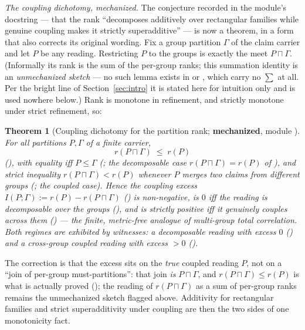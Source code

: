 \documentclass[11pt]{article}
\newtheorem{theorem}{Theorem}
\begin{document}
\emph{The coupling dichotomy, mechanized.}  The conjecture recorded
in the module's docstring --- that the rank ``decomposes additively
over rectangular families while genuine coupling makes it strictly
superadditive'' --- is now a theorem, in a form that also corrects
its original wording.  Fix a group partition $\Gamma$ of the claim
carrier and let $P$ be any reading.  Restricting $P$ to the groups
is exactly the meet $P \sqcap \Gamma$.  (Informally its rank is the
sum of the per-group ranks; this summation identity is an
\emph{unmechanized sketch} --- no such lemma exists in
 or , which carry no
$\sum$ at all.  Per the bright line of Section~\ref{sec:intro} it is
stated here for intuition only and is used nowhere below.)  Rank is
monotone in refinement, and strictly
monotone under strict refinement, so:
\begin{theorem}[Coupling dichotomy for the partition rank;
\textbf{mechanized}, module ]
\label{thm:couplingrank}
For all partitions $P, \Gamma$ of a finite carrier,
\[
  r(P \sqcap \Gamma) \;\le\; r(P)
\]
(), with equality iff $P \le \Gamma$
(; the \emph{decomposable} case
$r(P\sqcap\Gamma)=r(P)$ of ), and strict
inequality $r(P \sqcap \Gamma) < r(P)$ whenever $P$ merges two
claims from different groups
(; the \emph{coupled} case).
Hence the coupling excess $I(P;\Gamma) := r(P) - r(P \sqcap
\Gamma)$ () is non-negative, is $0$ iff the
reading is decomposable over the groups
(), and is strictly positive iff it
genuinely couples across them ()
--- the finite, metric-free analogue of multi-group total
correlation.  Both regimes are exhibited by  witnesses:
a decomposable reading with excess $0$
() and a cross-group
coupled reading with excess $> 0$
().
\end{theorem}
The correction is that the excess sits on the \emph{true} coupled
reading $P$, not on a ``join of per-group must-partitions'': that
join \emph{is} $P \sqcap \Gamma$, and $r(P \sqcap \Gamma) \le
r(P)$ is what is actually proved (); the
reading of $r(P \sqcap \Gamma)$ as a sum of per-group ranks remains
the unmechanized sketch flagged above.  Additivity for
rectangular families and strict superadditivity under coupling are
then the two sides of one monotonicity fact.
\end{document}
